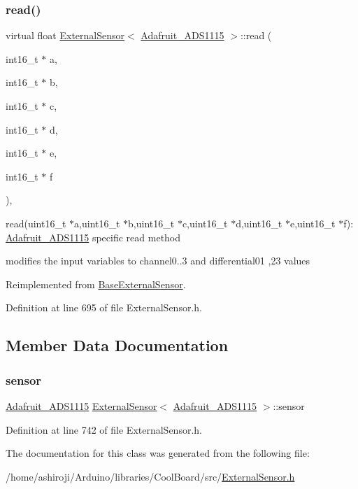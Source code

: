 \subsubsection{\texorpdfstring{read()}{read()}}
{\footnotesize\ttfamily virtual float \hyperlink{class_external_sensor}{External\+Sensor}$<$ \hyperlink{class_adafruit___a_d_s1115}{Adafruit\+\_\+\+A\+D\+S1115} $>$\+::read (\begin{DoxyParamCaption}\item[{int16\+\_\+t $\ast$}]{a,  }\item[{int16\+\_\+t $\ast$}]{b,  }\item[{int16\+\_\+t $\ast$}]{c,  }\item[{int16\+\_\+t $\ast$}]{d,  }\item[{int16\+\_\+t $\ast$}]{e,  }\item[{int16\+\_\+t $\ast$}]{f }\end{DoxyParamCaption})\hspace{0.3cm}{\ttfamily [inline]}, {\ttfamily [virtual]}}

read(uint16\+\_\+t $\ast$a,uint16\+\_\+t $\ast$b,uint16\+\_\+t $\ast$c,uint16\+\_\+t $\ast$d,uint16\+\_\+t $\ast$e,uint16\+\_\+t $\ast$f)\+: \hyperlink{class_adafruit___a_d_s1115}{Adafruit\+\_\+\+A\+D\+S1115} specific read method

modifies the input variables to channel0..3 and differential01 ,23 values 

Reimplemented from \hyperlink{class_base_external_sensor_a1867ba10561be26f2f5ec29421e6fb21}{Base\+External\+Sensor}.



Definition at line 695 of file External\+Sensor.\+h.



\subsection{Member Data Documentation}
\mbox{\label{class_external_sensor_3_01_adafruit___a_d_s1115_01_4_a0e1585ff946f9ce0e259d515baa4ad54}} 
\subsubsection{\texorpdfstring{sensor}{sensor}}
{\footnotesize\ttfamily \hyperlink{class_adafruit___a_d_s1115}{Adafruit\+\_\+\+A\+D\+S1115} \hyperlink{class_external_sensor}{External\+Sensor}$<$ \hyperlink{class_adafruit___a_d_s1115}{Adafruit\+\_\+\+A\+D\+S1115} $>$\+::sensor\hspace{0.3cm}{\ttfamily [private]}}



Definition at line 742 of file External\+Sensor.\+h.



The documentation for this class was generated from the following file\+:\begin{DoxyCompactItemize}
\item 
/home/ashiroji/\+Arduino/libraries/\+Cool\+Board/src/\hyperlink{_external_sensor_8h}{External\+Sensor.\+h}\end{DoxyCompactItemize}
